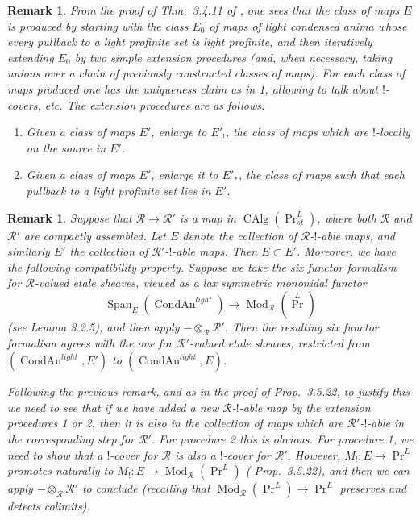 \documentclass[12pt]{article}
\newtheorem{remark}[theorem]{Remark}
\newcommand{\on}{\operatorname}
\newcommand{\mc}{\mathcal}
\begin{document}
\begin{remark}\label{actuallyconstruct}
From the proof of Thm.\ 3.4.11 of \cite{HeyerSixFunctors}, one sees that the class of maps $E$ is produced by starting with the class $E_0$ of maps of light condensed anima whose every pullback to a light profinite set is light profinite, and then iteratively extending $E_0$ by two simple extension procedures (and, when necessary, taking unions over a chain of previously constructed classes of maps).  For each class of maps produced one has the uniqueness claim as in 1, allowing to talk about $!$-covers, etc.  The extension procedures are as follows:
\begin{enumerate}
\item Given a class of maps $E'$, enlarge to $E'_!$, the class of maps which are $!$-locally on the source in $E'$.
\item Given a class of maps $E'$, enlarge it to $E'_\ast$, the class of maps such that each pullback to a light profinite set lies in $E'$.
\end{enumerate}
\end{remark}


\begin{remark}\label{changecoefficients}
Suppose that $\mathcal{R}\to \mathcal{R}'$ is a map in $\on{CAlg}(\on{Pr}^L_{st})$, where both $\mathcal{R}$ and $\mathcal{R}'$ are compactly assembled.  Let $E$ denote the collection of $\mathcal{R}$-$!$-able maps, and similarly $E'$ the collection of $\mathcal{R}'$-$!$-able maps. Then $E\subset E'$. Moreover, we have the following compatibility property.  Suppose we take the six functor formalism for $\mathcal{R}$-valued etale sheaves, viewed as a lax symmetric mononidal functor
$$\on{Span}_E(\on{CondAn}^{light})\to\on{Mod}_\mc{R}(\on{Pr}^L)$$
(see \cite{HeyerSixFunctors} Lemma 3.2.5), and then apply $-\otimes_\mathcal{R}\mathcal{R}'$.  Then the resulting six functor formalism agrees with the one for $\mathcal{R}'$-valued etale sheaves, restricted from $(\on{CondAn}^{light},E')$ to $(\on{CondAn}^{light},E)$.

Following the previous remark, and as in the proof of \cite{HeyerSixFunctors} Prop.\ 3.5.22, to justify this we need to see that if we have added a new $\mathcal{R}$-$!$-able map by the extension procedures 1 or 2, then it is also in the collection of maps which are $\mathcal{R}'$-$!$-able in the corresponding step for $\mathcal{R}'$.  For procedure 2 this is obvious.  For procedure 1, we need to show that a $!$-cover for $\mathcal{R}$ is also a $!$-cover for $\mathcal{R}'$.  However, $M_!:E \to \on{Pr}^L$ promotes naturally to $M_!: E \to \on{Mod}_\mathcal{R}(\on{Pr}^L)$ (\cite{HeyerSixFunctors} Prop.\ 3.5.22), and then we can apply $-\otimes_\mathcal{R}\mathcal{R}'$ to conclude (recalling that $\on{Mod}_\mathcal{R}(\on{Pr}^L)\to\on{Pr}^L$ preserves and detects colimits).
\end{remark}
\end{document}
